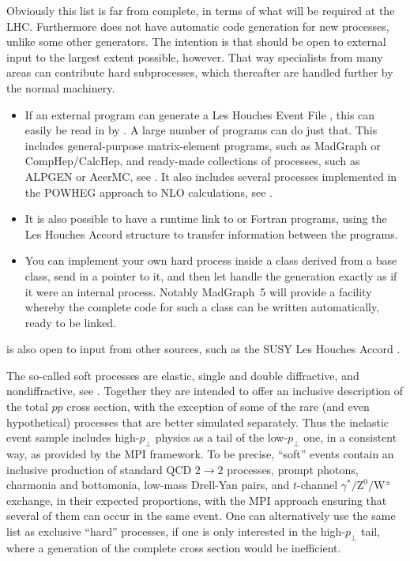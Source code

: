 Obviously this list is far from complete, in terms of what will be
required at the LHC. Furthermore \pythia does not have automatic code 
generation for new processes, unlike some other generators. 
The intention is that \pythia should be open to external input to the 
largest extent possible, however. That way specialists from many areas 
can contribute hard subprocesses, which thereafter are handled further 
by the normal \pythia machinery.
\begin{itemize}
\item If an external program can generate a Les Houches Event File
\cite{Alwall:2006yp}, this can easily be read in by \pythia. 
A large number of programs can do just that. This includes 
general-purpose matrix-element programs, such as MadGraph or 
CompHep/CalcHep, and ready-made collections of processes, such as 
ALPGEN or AcerMC, see . It also includes 
several processes implemented in the POWHEG approach to NLO calculations,
see . 
\item It is also possible to have a runtime link to \cpp or Fortran
programs, using the Les Houches Accord \cite{Boos:2001cv} structure 
to transfer information between the programs.
\item You can implement your own hard process inside a class derived from 
a \pythia base class, send in a pointer to it, and then let \pythia
handle the generation exactly as if it were an internal process. 
Notably MadGraph~5 will provide a facility whereby the complete code 
for such a class can be written automatically, ready to be linked.  
\end{itemize}  
\pythia is also open to input from other sources, such as the 
SUSY Les Houches Accord \cite{Skands:2003cj,Allanach:2008qq}.



The so-called soft processes are elastic, single and double diffractive, 
and nondiffractive, see . Together they are intended to 
offer an inclusive description of the total $pp$ cross section, with the 
exception of some of the rare (and even hypothetical) processes that
are better simulated separately. Thus the inelastic event sample includes 
high-$p_{\perp}$ physics as a tail of the low-$p_{\perp}$ one, in a 
consistent way, as provided by the MPI framework. To be precise, 
``soft'' events contain an inclusive production of standard QCD 
$2 \to 2$ processes, prompt photons, charmonia and bottomonia, low-mass 
Drell-Yan pairs, and $t$-channel $\gamma^*/\mathrm{Z}^0/\mathrm{W}^{\pm}$ 
exchange, in their expected proportions, with the MPI approach ensuring
that several of them can occur in the same event. One can alternatively use 
the same list as exclusive ``hard'' processes, if one is only interested in 
the high-$p_{\perp}$ tail, where a generation of the complete cross section 
would be inefficient.

